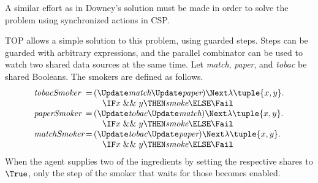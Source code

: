 A similar effort as in Downey's solution must be made in order to solve the problem using synchronized actions in CSP.

TOP allows a simple solution to this problem, using guarded steps.
Steps can be guarded with arbitrary expressions, and the parallel combinator can be used to watch two shared data sources at the same time.
Let \textit{match}, \textit{paper}, and \textit{tobac} be shared Booleans.
The smokers are defined as follows.
\begin{equation*}
\begin{array}{l @{\,} c @{\,} l}
  \textit{tobacSmoker} & = & (\Update \textit{match} \And \Update \textit{paper}) \Next \lambda \tuple{x,y}. \\
    & & \quad \IF x \mathrel{\&\&} y \THEN \textit{smoke} \ELSE \Fail \\
  \textit{paperSmoker} & = & (\Update \textit{tobac} \And \Update \textit{match}) \Next \lambda \tuple{x,y}. \\
    & & \quad \IF x \mathrel{\&\&} y \THEN \textit{smoke} \ELSE \Fail \\
  \textit{matchSmoker} & = & (\Update \textit{tobac} \And \Update \textit{paper}) \Next \lambda \tuple{x,y}. \\
    & & \quad \IF x \mathrel{\&\&} y \THEN \textit{smoke} \ELSE \Fail \\
\end{array}
\end{equation*}
When the agent supplies two of the ingredients by setting the respective shares to $\True$, only the step of the smoker that waits for those becomes enabled.
